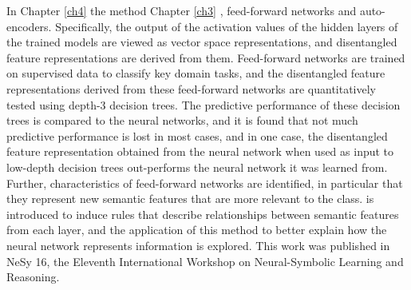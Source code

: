 In Chapter \ref{ch4}\hmark{,} the method  Chapter \ref{ch3} ,  feed-forward networks and auto-encoders. Specifically, the output of the activation values of the hidden layers  of the trained models are viewed as vector space representations,  and  disentangled feature representations are derived from them. Feed-forward networks are trained on supervised data to classify key domain tasks, and the disentangled feature representations derived from these feed-forward networks are quantitatively tested using depth-3 decision trees. The predictive performance of these decision trees is compared to the neural networks, and it is found that not much predictive performance is lost in most cases, and in one case, the disentangled feature representation obtained from the neural network when used as input to low-depth decision trees  out-performs the neural network it was learned from.  Further, characteristics of feed-forward networks are identified, in particular that they represent new semantic features that are more relevant to the class.   is introduced to induce rules that describe relationships between semantic features from each layer, and the application of this method to  better explain how the neural network represents information is explored. This work was published in NeSy 16, the Eleventh International Workshop on Neural-Symbolic Learning and Reasoning.





